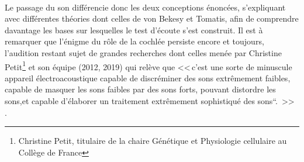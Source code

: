 \\
Le passage du son différencie donc les deux conceptions énoncées, s'expliquant avec différentes 
théories  dont celles de von Bekesy et 
Tomatis, afin de comprendre 
davantage les bases sur lesquelles le test d'écoute s'est construit.
Il est à 
remarquer que l'énigme du 
rôle de la cochlée persiste encore et toujours, l'audition restant 
sujet de grandes 
recherches dont celles menée par Christine Petit\footnote{Christine Petit, titulaire de la 
	chaire Génétique et
	Physiologie cellulaire au Collège de France} et son équipe (2012, 
2019) %
qui relève que 
<<\,c'est une sorte de minuscule appareil électroacoustique capable
de discréminer des sons extrêmement faibles, capable de masquer
	les sons faibles par des sons forts, pouvant distordre les
	sons,et capable d'élaborer un traitement extrêmement
	sophistiqué des sons``. \,>> \autocite{petit_lookscience}.%

